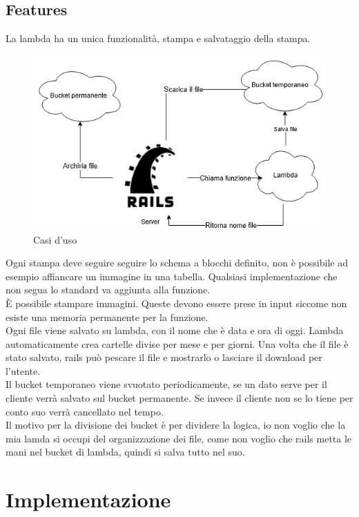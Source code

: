 \documentclass[12pt]{article}
\begin{document}
\subsection{Features}
La lambda ha un unica funzionalità, stampa e salvataggio della stampa.
\begin{figure}[H]
\includegraphics[scale = 0.6]{useCases.png}
\caption{Casi d'uso}
\label{fig:mesh2}
\end{figure}
Ogni stampa deve seguire seguire lo schema a blocchi definito, non è possibile 
ad esempio affiancare un immagine in una tabella. 
Qualsiasi implementazione che non segua lo standard va aggiunta alla funzione.
\\ È possibile stampare immagini. Queste devono essere prese in input siccome non 
esiste una memoria permanente per la funzione.
\\ Ogni file viene salvato su lambda, con il nome che è data e ora di oggi. 
Lambda automaticamente crea cartelle divise per mese e per giorni. 
Una volta che il file è stato salvato, rails può pescare il file e mostrarlo 
o lasciare il download per l'utente.
\\ Il bucket temporaneo viene svuotato periodicamente, se un dato serve per il 
cliente verrà salvato sul bucket permanente. 
Se invece il cliente non se lo tiene per conto suo verrà cancellato nel tempo.
\\ Il motivo per la divisione dei bucket è per dividere la logica, io non voglio 
che la mia lamda si occupi del organizzazione dei file, come non voglio 
che rails metta le mani nel bucket di lambda, quindi si salva tutto nel suo.



\section{Implementazione}
\end{document}
